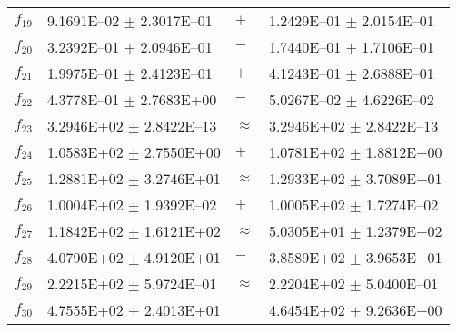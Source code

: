 \begin{table}[ht]
\begin{tabular}{|l|ll|l|}
  $f_{19}$ & 9.1691E--02 $\pm$ 2.3017E--01 & $+$ & 1.2429E--01 $\pm$ 2.0154E--01 \\ 
  $f_{20}$ & 3.2392E--01 $\pm$ 2.0946E--01 & $-$ & 1.7440E--01 $\pm$ 1.7106E--01 \\ 
  $f_{21}$ & 1.9975E--01 $\pm$ 2.4123E--01 & $+$ & 4.1243E--01 $\pm$ 2.6888E--01 \\ 
  $f_{22}$ & 4.3778E--01 $\pm$ 2.7683E+00 & $-$ & 5.0267E--02 $\pm$ 4.6226E--02 \\ 
  $f_{23}$ & 3.2946E+02 $\pm$ 2.8422E--13 & $\approx$ & 3.2946E+02 $\pm$ 2.8422E--13 \\ 
  $f_{24}$ & 1.0583E+02 $\pm$ 2.7550E+00 & $+$ & 1.0781E+02 $\pm$ 1.8812E+00 \\ 
  $f_{25}$ & 1.2881E+02 $\pm$ 3.2746E+01 & $\approx$ & 1.2933E+02 $\pm$ 3.7089E+01 \\ 
  $f_{26}$ & 1.0004E+02 $\pm$ 1.9392E--02 & $+$ & 1.0005E+02 $\pm$ 1.7274E--02 \\ 
  $f_{27}$ & 1.1842E+02 $\pm$ 1.6121E+02 & $\approx$ & 5.0305E+01 $\pm$ 1.2379E+02 \\ 
  $f_{28}$ & 4.0790E+02 $\pm$ 4.9120E+01 & $-$ & 3.8589E+02 $\pm$ 3.9653E+01 \\ 
  $f_{29}$ & 2.2215E+02 $\pm$ 5.9724E--01 & $\approx$ & 2.2204E+02 $\pm$ 5.0400E--01 \\ 
  $f_{30}$ & 4.7555E+02 $\pm$ 2.4013E+01 & $-$ & 4.6454E+02 $\pm$ 9.2636E+00 \\ 
   \hline
\end{tabular}
\end{table}
